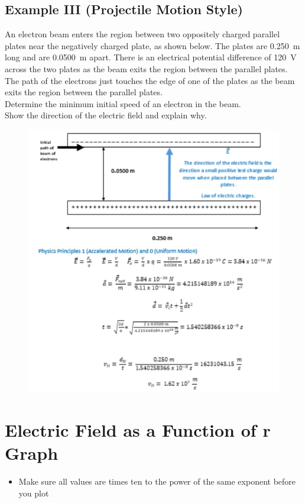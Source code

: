 \documentclass[a4paper,12pt]{article}
\begin{document}
\subsection{Example III (Projectile Motion Style)}
An electron beam enters the region between two oppositely charged parallel plates near the negatively charged plate, as shown below. The plates are \SI{0.250}{\m} long and are \SI{0.0500}{\m} apart. There is an electrical potential difference of \SI{120}{\volt} across the two plates as the beam exits the region between the parallel plates. The path of the electrons just touches the edge of one of the plates as the beam exits the region between the parallel plates. \\Determine the minimum initial speed of an electron in the beam. \\Show the direction of the electric field and explain why.
\begin{figure}[H]
    \centering
    \includegraphics[width=\textwidth]{particleplates}
\end{figure}

\section{Electric Field as a Function of r Graph}
\begin{itemize}
    \item{Make sure all values are times ten to the power of the same exponent before you plot}
\end{itemize}
\end{document}
